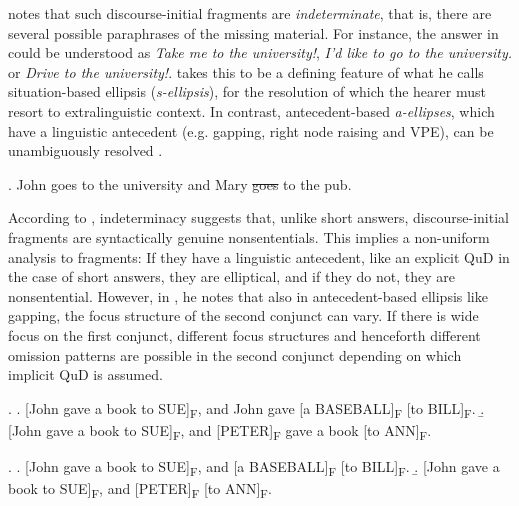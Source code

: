 \citet[1852]{reich2011} notes that such discourse-initial fragments are \textit{indeterminate}, that is, there are several possible paraphrases of the missing material. For instance, the answer in \LLast[a] could be understood as \textit{Take me to the university!}, \textit{I'd like to go to the university.} or \textit{Drive to the university!}. \citeauthor{reich2011} takes this to be a defining feature of what he calls situation-based ellipsis (\textit{s-ellipsis}), for the resolution of which the hearer must resort to extralinguistic context. In contrast, antecedent-based \textit{a-ellipses}, which have a linguistic antecedent (e.g. gapping, right node raising and VPE), can be unambiguously resolved \Next.
\largerpage

\ex. John goes to the university and Mary \sout{goes} to the pub.

According to \citet[1852]{reich2011}, indeterminacy suggests that, unlike short answers, discourse-initial fragments are syntactically genuine nonsententials. This implies a non-uniform analysis to fragments: If they have a linguistic antecedent, like an explicit QuD in the case of short answers, they are elliptical, and if they do not, they are nonsentential. However, in \citet{reich2007}, he notes that also in antecedent-based ellipsis like gapping, the focus structure of the second conjunct can vary. If there is wide focus on the first conjunct, different focus structures \Next and henceforth different omission patterns \NNext are possible in the second conjunct depending on which implicit QuD is assumed.

\ex. \a. [John gave a book to SUE]\textsubscript{F}, and John gave [a BASEBALL]\textsubscript{F} [to BILL]\textsubscript{F}. 
    \b. [John gave a book to SUE]\textsubscript{F}, and [PETER]\textsubscript{F} gave a book [to ANN]\textsubscript{F}.\\ \mbox{}\hfill\hfill\citep[478]{reich2007}

\ex. \a. [John gave a book to SUE]\textsubscript{F}, and [a BASEBALL]\textsubscript{F} [to BILL]\textsubscript{F}. 
    \b. [John gave a book to SUE]\textsubscript{F}, and [PETER]\textsubscript{F} [to ANN]\textsubscript{F}.\\ \mbox{}\hfill\hfill\citep[478]{reich2007}
    

